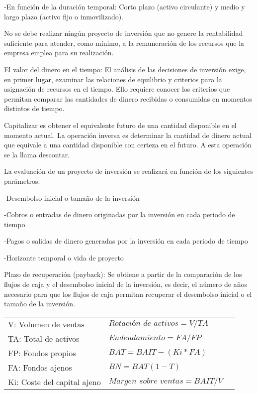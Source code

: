 \documentclass[12pt, twoside, openright]{report} %
\begin{document}
-En función de la duración temporal: Corto plazo (activo circulante) y medio y largo plazo (activo fijo o
inmovilizado).

No se debe realizar ningún proyecto de inversión que no genere la rentabilidad suficiente para atender, como
mínimo, a la remuneración de los recursos que la empresa emplea para su realización.

El valor del dinero en el tiempo: El análisis de las decisiones de inversión exige, en primer lugar, examinar
las relaciones de equilibrio y criterios para la asignación de recursos en el tiempo. Ello requiere conocer los
criterios que permitan comparar las cantidades de dinero recibidas o consumidas en momentos distintos de
tiempo.

Capitalizar es obtener el equivalente futuro de una cantidad disponible en el momento actual. La operación
inversa es determinar la cantidad de dinero actual que equivale a una cantidad disponible con certeza en el
futuro. A esta operación se la llama descontar.

La evaluación de un proyecto de inversión se realizará en función de los siguientes parámetros:

-Desembolso inicial o tamaño de la inversión

-Cobros o entradas de dinero originadas por la inversión en cada periodo de tiempo

-Pagos o salidas de dinero generadas por la inversión en cada periodo de tiempo

-Horizonte temporal o vida de proyecto
\pagebreak

Plazo de recuperación (payback): Se obtiene a partir de la comparación de los flujos de caja y el desembolso
inicial de la inversión, es decir, el número de años necesario para que los flujos de caja permitan recuperar el
desembolso inicial o el tamaño de la inversión.
\begin{table}[H]
	\begin{tabular}{lll}
		V: Volumen de ventas        & $\textit{Rotación de activos} = V / TA$   \\
		TA: Total de activos        & $\textit{Endeudamiento} = FA / FP$        \\
		FP: Fondos propios          & $BAT = BAIT - (Ki * FA)$                  \\
		FA: Fondos ajenos           & $BN = BAT (1 - T)$                        \\
		Ki: Coste del capital ajeno & $\textit{Margen sobre ventas} = BAIT / V$ \\
	\end{tabular}
\end{table}
\end{document}
